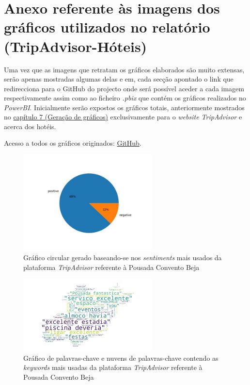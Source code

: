 \chapter{Anexo referente às imagens dos gráficos utilizados no relatório (TripAdvisor-Hóteis)}
\label{an1}

Uma vez que as imagens que retratam os gráficos elaborados são muito extensas, serão apenas mostradas algumas delas e em, cada secção apontado o link que redirecciona para o GitHub do projecto onde será possível aceder a cada imagem respectivamente assim como ao ficheiro \textit{.pbix} que contém os gráficos realizados no \textit{PowerBI}.
Inicialmente serão expostos os gráficos totais, anteriormente mostrados no \hyperref[cap7]{ capítulo 7 (Geração de gráficos)} exclusivamente para o \textit{website TripAdvisor} e acerca dos hotéis.

Acesso a todos os gráficos originados: \href{https://github.com/CatKinKitKat/pi2021/tree/master/projecto/datascience/graphs/TripAdvisor/hotels}{GitHub}.

\begin{figure}[!htb]
\centering
\includegraphics[width=7cm]{figuras/TripAdvisor/Hotels/hotel0_sentiments.jpeg}
\caption{Gráfico circular gerado baseando-se nos \textit{sentiments} mais usados da plataforma \textit{TripAdvisor} referente à Pousada Convento Beja}
\label{fig:exemplofig}
\end{figure}

\begin{figure}[!htb]
\centering
\includegraphics[width=7cm]{figuras/TripAdvisor/Hotels/hotel0_keywordcloud.jpeg}
\caption{Gráfico de palavras-chave e nuvens de palavras-chave contendo as \textit{keywords} mais usadas da plataforma \textit{TripAdvisor} referente à Pousada Convento Beja}
\label{fig:exemplofig}
\end{figure}

